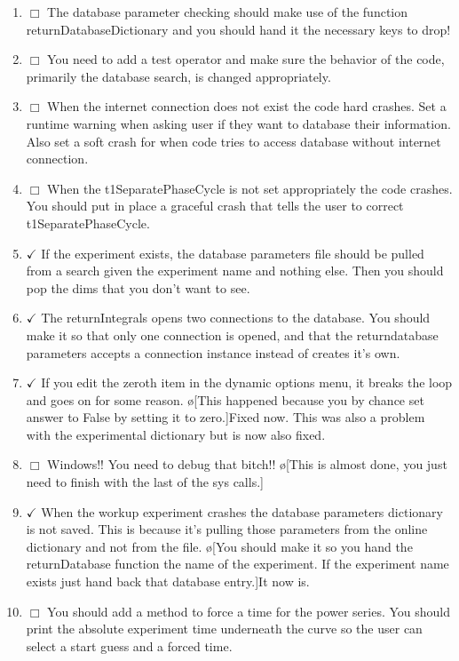 \documentclass[10pt]{book}
\begin{document}
\begin{enumerate}
    \item $\Box$ The database parameter checking should make use of the function returnDatabaseDictionary and you should hand it the necessary keys to drop!
    \item $\Box$ You need to add a test operator and make sure the behavior of the code, primarily the database search, is changed appropriately.
    \item $\Box$ When the internet connection does not exist the code hard crashes. Set a runtime warning when asking user if they want to database their information. Also set a soft crash for when code tries to access database without internet connection.
    \item $\Box$ When the t1SeparatePhaseCycle is not set appropriately the code crashes. You should put in place a graceful crash that tells the user to correct t1SeparatePhaseCycle.
    \item $\checkmark$ If the experiment exists, the database parameters file should be pulled from a search given the experiment name and nothing else. Then you should pop the dims that you don't want to see. 
    \item $\checkmark$ The returnIntegrals opens two connections to the database. You should make it so that only one connection is opened, and that the returndatabase parameters accepts a connection instance instead of creates it's own.
    \item $\checkmark$ If you edit the zeroth item in the dynamic options menu, it breaks the loop and goes on for some reason. \o[This happened because you by chance set answer to False by setting it to zero.]{Fixed now. This was also a problem with the experimental dictionary but is now also fixed.} 
    \item $\Box$ Windows!! You need to debug that bitch!! \o[This is almost done, you just need to finish with the last of the sys calls.]{}
    \item $\checkmark$ When the workup experiment crashes the database parameters dictionary is not saved. This is because it's pulling those parameters from the online dictionary and not from the file. \o[You should make it so you hand the returnDatabase function the name of the experiment. If the experiment name exists just hand back that database entry.]{It now is.}
    \item $\Box$ You should add a method to force a time for the power series. You should print the absolute experiment time underneath the curve so the user can select a start guess and a forced time.

\end{enumerate}
\end{document}
